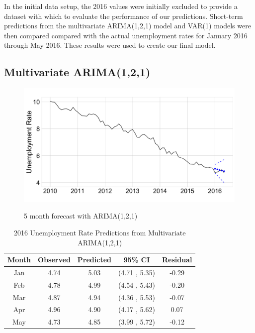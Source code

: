 \documentclass[twoside,twocolumn]{article}
\begin{document}
In the initial data setup, the 2016 values were initially excluded to provide a dataset with which to evaluate the performance of our predictions. Short-term predictions from the multivariate ARIMA(1,2,1) model and VAR(1) models were then compared compared with the actual unemployment rates for January 2016 through May 2016. These results were used to create our final model.

\subsection{Multivariate ARIMA(1,2,1)}

   \begin{figure}[htb]
    	\centering
     	\caption{5 month forecast with ARIMA(1,2,1)}
     	\includegraphics[width=\linewidth]{images/ARIMApred}
     	\label{fig:arimapred}
 \end{figure}

\begin{table}[ht]
\centering
\caption{2016 Unemployment Rate Predictions from Multivariate ARIMA(1,2,1)}
\label{tab:arimaforecast}
\begin{tabular}{ccccc}
  \hline
 Month & Observed & Predicted& 95\% CI  & Residual \\
  \hline
Jan & 4.74 & 5.03 & (4.71 , 5.35) & -0.29 \\
Feb & 4.78 & 4.99 & (4.54 , 5.43) & -0.20 \\
Mar & 4.87 & 4.94 & (4.36 , 5.53) & -0.07 \\
Apr & 4.96 & 4.90 & (4.17 , 5.62) & 0.07 \\
May & 4.73 & 4.85 & (3.99 , 5.72) & -0.12 \\
   \hline
\end{tabular}
\end{table}
\end{document}
